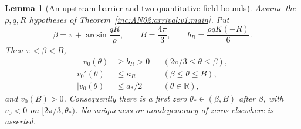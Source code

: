 \documentclass[11pt]{article}
\numberwithin{equation}{section}
\newtheorem{lemma}[theorem]{Lemma}
\theoremstyle{remark}
\newcommand{\R}{\mathbb R}
\begin{document}
\begin{lemma}[An upstream barrier and two quantitative field bounds]
\label{inc:AN02:arrival:v1:barrier}
Assume the $\rho,q,R$ hypotheses of Theorem~\ref{inc:AN02:arrival:v1:main}.
Put
\[
 \beta=\pi+\arcsin\frac{qR}{\rho},\qquad
 B=\frac{4\pi}{3},\qquad
 b_R=\frac{\rho qK(-R)}6.
\]
Then $\pi<\beta<B$,
\begin{align}
 -v_0(\theta)&\ge b_R>0
       &&(2\pi/3\le\theta\le\beta),
 \label{inc:AN02:arrival:v1:speed}\\
 v_0' (\theta)&\le\kappa_R
       &&(\beta\le\theta\le B),
 \label{inc:AN02:arrival:v1:tailcurvature}\\
 |v_0(\theta)|&\le a_*/2
       &&(\theta\in\R),
 \label{inc:AN02:arrival:v1:maxspeed}
\end{align}
and $v_0(B)>0$.
Consequently there is a first zero $\theta_*\in(\beta,B)$ after $\beta$,
with $v_0<0$ on $[2\pi/3,\theta_*)$.
No uniqueness or nondegeneracy of zeros elsewhere is asserted.
\end{lemma}
\end{document}

